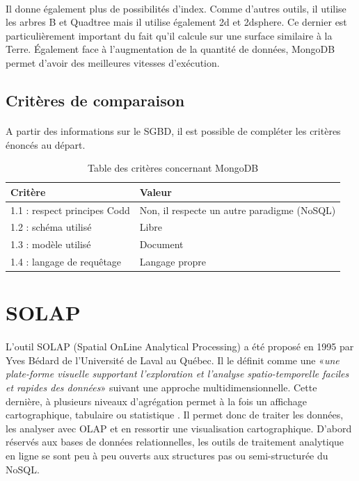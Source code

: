 \paragraph{}Il donne également plus de possibilités d’index. Comme d’autres outils, il utilise les arbres B et Quadtree mais il utilise également 2d et 2dsphere\cite{2dsphere}. Ce dernier est particulièrement important du fait qu’il calcule sur une surface similaire à la Terre. Également face à l’augmentation de la quantité de données, MongoDB permet d’avoir des meilleures vitesses d’exécution.

\subsection{Critères de comparaison}

\paragraph{}A partir des informations sur le \acrshort{SGBD}, il est possible de compléter les critères énoncés au départ.
\begin{table}[h!]
    \centering
	\begin{tabular}{|p{5cm}|p{7cm}|} 
  	\hline
  	\textbf{Critère} & \textbf{Valeur} \\
  	
  	\hline
  	1.1 : respect principes Codd & Non, il respecte un autre paradigme (NoSQL) \\
  	\hline
  	1.2 : schéma utilisé & Libre \\
  	\hline
  	1.3 : modèle utilisé & Document \\
  	\hline
  	1.4 : langage de requêtage & Langage propre \\
  	\hline
	\end{tabular}
    \caption{Table des critères concernant MongoDB}
    \label{tab:critere-mongo}
\end{table}


\section{SOLAP}

\paragraph{}L’outil SOLAP (Spatial OnLine Analytical Processing) a été proposé en 1995 par Yves Bédard de l’Université de Laval au Québec. Il le définit comme une «\textit{une plate-forme visuelle supportant l'exploration et l'analyse spatio-temporelle faciles et rapides des données}» suivant une approche multidimensionnelle. Cette dernière, à plusieurs niveaux d'agrégation permet à la fois un affichage cartographique, tabulaire ou statistique \cite{defsolap}. Il permet donc de traiter les données, les analyser avec OLAP et en ressortir une visualisation cartographique. D’abord réservés aux bases de données relationnelles, les outils de traitement analytique en ligne se sont peu à peu ouverts aux structures pas ou semi-structurée du NoSQL.

